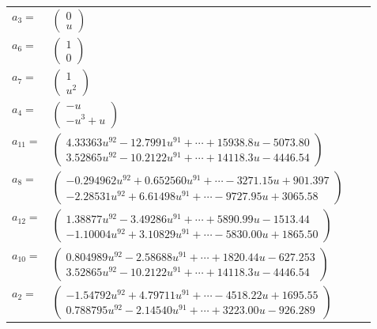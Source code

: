 \documentclass[1p]{elsarticle_modified}
\theoremstyle{definition}
\begin{document}
\begin{tabular}{m{7pt} m{180pt} m{7pt} m{180pt} }
\flushright $a_{3}=$&$\begin{pmatrix}0\\u\end{pmatrix}$ \\
\flushright $a_{6}=$&$\begin{pmatrix}1\\0\end{pmatrix}$ \\
\flushright $a_{7}=$&$\begin{pmatrix}1\\u^2\end{pmatrix}$ \\
\flushright $a_{4}=$&$\begin{pmatrix}- u\\- u^3+u\end{pmatrix}$ \\
\flushright $a_{11}=$&$\begin{pmatrix}4.33363 u^{92}-12.7991 u^{91}+\cdots+15938.8 u-5073.80\\3.52865 u^{92}-10.2122 u^{91}+\cdots+14118.3 u-4446.54\end{pmatrix}$ \\
\flushright $a_{8}=$&$\begin{pmatrix}-0.294962 u^{92}+0.652560 u^{91}+\cdots-3271.15 u+901.397\\-2.28531 u^{92}+6.61498 u^{91}+\cdots-9727.95 u+3065.58\end{pmatrix}$ \\
\flushright $a_{12}=$&$\begin{pmatrix}1.38877 u^{92}-3.49286 u^{91}+\cdots+5890.99 u-1513.44\\-1.10004 u^{92}+3.10829 u^{91}+\cdots-5830.00 u+1865.50\end{pmatrix}$ \\
\flushright $a_{10}=$&$\begin{pmatrix}0.804989 u^{92}-2.58688 u^{91}+\cdots+1820.44 u-627.253\\3.52865 u^{92}-10.2122 u^{91}+\cdots+14118.3 u-4446.54\end{pmatrix}$ \\
\flushright $a_{2}=$&$\begin{pmatrix}-1.54792 u^{92}+4.79711 u^{91}+\cdots-4518.22 u+1695.55\\0.788795 u^{92}-2.14540 u^{91}+\cdots+3223.00 u-926.289\end{pmatrix}$ \\

\end{tabular}
\end{document}

